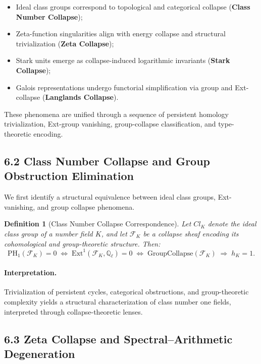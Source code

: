 \documentclass[11pt]{article}
\newtheorem{definition}[theorem]{Definition}
\begin{document}
\begin{itemize}
    \item Ideal class groups correspond to topological and categorical collapse (\textbf{Class Number Collapse});
    \item Zeta-function singularities align with energy collapse and structural trivialization (\textbf{Zeta Collapse});
    \item Stark units emerge as collapse-induced logarithmic invariants (\textbf{Stark Collapse});
    \item Galois representations undergo functorial simplification via group and Ext-collapse (\textbf{Langlands Collapse}).
\end{itemize}

These phenomena are unified through a sequence of persistent homology trivialization, Ext-group vanishing, group-collapse classification, and type-theoretic encoding.

\subsection*{6.2 Class Number Collapse and Group Obstruction Elimination}

We first identify a structural equivalence between ideal class groups, Ext-vanishing, and group collapse phenomena.

\begin{definition}[Class Number Collapse Correspondence]
Let \( Cl_K \) denote the ideal class group of a number field \( K \),  
and let \( \mathcal{F}_K \) be a collapse sheaf encoding its cohomological and group-theoretic structure. Then:
\[
\mathrm{PH}_1(\mathcal{F}_K) = 0 \;\Leftrightarrow\; \mathrm{Ext}^1(\mathcal{F}_K, \mathbb{Q}_\ell) = 0 \;\Leftrightarrow\; \text{GroupCollapse}(\mathcal{F}_K) \;\Rightarrow\; h_K = 1.
\]
\end{definition}

\paragraph{Interpretation.}
Trivialization of persistent cycles, categorical obstructions, and group-theoretic complexity yields a structural characterization of class number one fields, interpreted through collapse-theoretic lenses.

\subsection*{6.3 Zeta Collapse and Spectral–Arithmetic Degeneration}
\end{document}
